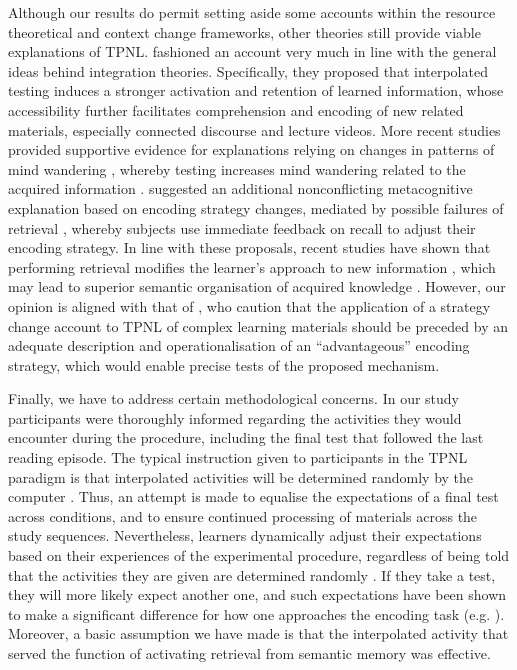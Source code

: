 \documentclass[../main.tex]{subfiles}
\begin{document}
Although our results do permit setting aside some accounts within the 
resource theoretical and context change frameworks, other theories still 
provide viable explanations of TPNL. \cite{wissmanInterimTestEffect2011} 
fashioned an account very much in line with the general ideas behind 
integration theories. Specifically, they proposed that interpolated testing 
induces a stronger activation and retention of learned information, whose 
accessibility further facilitates comprehension and encoding of new related 
materials, especially connected discourse and lecture videos. More recent 
studies provided supportive evidence for explanations relying on changes in 
patterns of mind wandering \citep{szpunarInterpolatedMemoryTests2013}, whereby 
testing increases mind wandering related to the acquired information
\citep{jingInterpolatedTestingInfluences2016}. 
\cite{wissmanInterimTestEffect2011} suggested an additional nonconflicting 
metacognitive explanation based on encoding strategy changes, mediated by 
possible failures of retrieval \citep{bahrickImportanceRetrievalFailures2005}, 
whereby subjects use immediate feedback on recall to adjust their encoding 
strategy. In line with these proposals, recent studies have shown that 
performing retrieval modifies the learner's approach to new
information \citep{choTestingEnhancesBoth2017, 
soderstromTestingFacilitatesRegulation2014}, which may lead to superior 
semantic organisation of acquired knowledge 
\citep{chanTestingPotentiatesNew2018, jingInterpolatedTestingInfluences2016}. 
However, our opinion is aligned with that of 
\cite{chanTestingPotentiatesNew2018}, who caution that the application 
of a strategy change account to TPNL of complex learning materials should be 
preceded by an adequate description and operationalisation of an
``advantageous'' encoding strategy, which would enable precise tests of the
proposed mechanism.

Finally, we have to address certain methodological concerns. In our study 
participants were thoroughly informed regarding the activities they would
encounter during the procedure, including the final test that followed the last 
reading episode. The typical instruction given to participants in the TPNL 
paradigm is that interpolated activities will be determined randomly by the 
computer \cite{yangEnhancingLearningRetrieval2018}. Thus, an attempt is made to 
equalise the expectations of a final test across conditions, and to ensure 
continued processing of materials across the study sequences. Nevertheless,
learners dynamically adjust their expectations based on their experiences of 
the experimental procedure, regardless of being told that the activities they
are given are determined randomly \citep{weinsteinRoleTestExpectancy2014}. If
they take a test, they will more likely expect another one, and such 
expectations have been shown to make a significant difference for how one 
approaches the encoding task (e.g. 
\citealp{szpunarExpectationFinalCumulative2007}). Moreover, a basic assumption 
we have made is that the interpolated activity that served the function of 
activating retrieval from semantic memory was effective.
\end{document}
